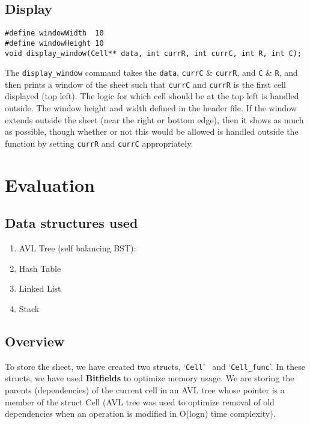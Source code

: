 \documentclass{article}
\begin{document}
\subsection{Display}
\begin{lstlisting}
#define windowWidth  10
#define windowHeight 10
void display_window(Cell** data, int currR, int currC, int R, int C);
\end{lstlisting}
The \lstinline{display_window} command takes the \lstinline{data}, \lstinline{currC} \& \lstinline{currR}, and \lstinline{C} \& \lstinline{R}, and then prints a window of the sheet such that \lstinline{currC} and \lstinline{currR} is the first cell displayed (top left). The logic for which cell should be at the top left is handled outside. The window height and width defined in the header file. If the window extends outside the sheet (near the right or bottom edge), then it shows as much as possible, though whether or not this would be allowed is handled outside the function by setting \lstinline{currR} and \lstinline{currC} appropriately.
\section{Evaluation}
\subsection{Data structures used}
\begin{enumerate}
    \item AVL Tree (self balancing BST):
    \item Hash Table
    \item Linked List
    \item Stack
\end{enumerate}
\subsection{Overview}
To store the sheet, we have created two structs, \textquoteleft \lstinline{Cell}\textquoteright 
 \ and \textquoteleft \lstinline{Cell_func}\textquoteright. In these structs, we have used \textbf{Bitfields} to optimize memory usage. We are storing the parents (dependencies) of the current cell in an AVL tree whose pointer is a member of the struct Cell (AVL tree was used to optimize removal of old dependencies when an operation is modified in O(logn) time complexity). 
\end{document}
